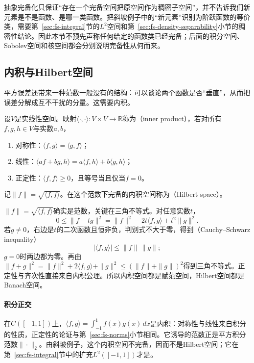 抽象完备化只保证“存在一个完备空间把原空间作为稠密子空间”，并不告诉我们新元素是不是函数、是哪一类函数。把斜坡例子中的“新元素”识别为阶跃函数的等价类，需要第~\ref{sec:fs-integral}节的$L^2$空间和第~\ref{sec:fs-density-separability}小节的稠密性结论。因此本节不预先声称任何给定的函数类已经完备；后面的积分空间、Sobolev空间和核空间都会分别说明完备性从何而来。

\subsection{内积与Hilbert空间}
\label{sec:fs-hilbert}

平方误差还带来一种范数一般没有的结构：可以谈论两个函数是否“垂直”，从而把误差分解成互不干扰的分量。这需要内积。

\begin{definition}[实内积与Hilbert空间]
\label{def:fs-inner-product}
设$V$是实线性空间。映射$\langle\cdot,\cdot\rangle:V\times V\to\mathbb R$称为（inner product），若对所有$f,g,h\in V$与实数$a,b$，
\begin{enumerate}
 \item 对称性：$\langle f,g\rangle=\langle g,f\rangle$；
 \item 线性：$\langle af+bg,h\rangle=a\langle f,h\rangle+b\langle g,h\rangle$；
 \item 正定性：$\langle f,f\rangle\geq0$，且等号当且仅当$f=0$。
\end{enumerate}
记$\|f\|=\sqrt{\langle f,f\rangle}$。在这个范数下完备的内积空间称为（Hilbert space）。
\end{definition}

$\|f\|=\sqrt{\langle f,f\rangle}$确实是范数，关键在三角不等式。对任意实数$t$，
\[
 0\leq\|f-tg\|^2=\|f\|^2-2t\langle f,g\rangle+t^2\|g\|^2 .
\]
若$g\neq0$，右边是$t$的二次函数且恒非负，判别式不大于零，得到（Cauchy--Schwarz inequality）
\begin{equation}
 |\langle f,g\rangle|\leq\|f\|\,\|g\| ;
 \label{eq:fs-cauchy-schwarz}
\end{equation}
$g=0$时两边都为零。再由$\|f+g\|^2=\|f\|^2+2\langle f,g\rangle+\|g\|^2\leq(\|f\|+\|g\|)^2$得到三角不等式。正定性与齐次性直接来自内积公理。所以内积空间都是赋范空间，Hilbert空间都是Banach空间。

\paragraph{积分正交}
在$C([-1,1])$上，$\langle f,g\rangle=\int_{-1}^1f(x)g(x)\,dx$是内积：对称性与线性来自积分的性质，正定性的论证与第~\ref{sec:fs-norms}小节相同。它诱导的范数正是平方积分范数$\|\cdot\|_2$。由斜坡例子，这个内积空间不完备，因而不是Hilbert空间；它在第~\ref{sec:fs-integral}节中的扩充$L^2([-1,1])$才是。

